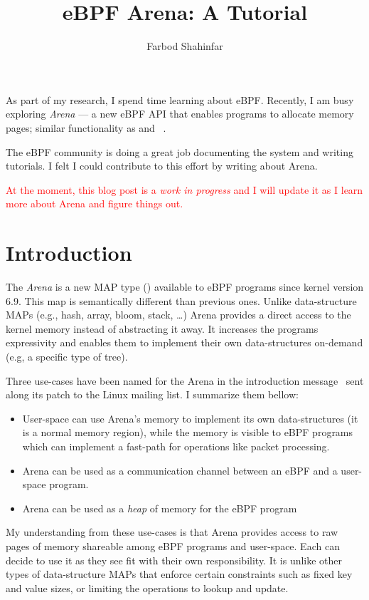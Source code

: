 \documentclass{article}
\title{eBPF Arena: A Tutorial}
\author{Farbod Shahinfar}
\begin{document}
\maketitle



As part of my research, I spend time learning about eBPF.
Recently, I am busy exploring \emph{Arena} --- a new eBPF API that enables
programs to allocate memory pages; similar functionality as  and
~\cite{arenapatch}.

The eBPF community is doing a great job documenting the system and writing
tutorials. I felt I could contribute to this effort by writing about Arena.

{
    \textcolor{red}{At the moment, this blog post is a \emph{work in
    progress} and I will update it as I learn more about Arena and figure
    things out.}
}

\section{Introduction}

The \emph{Arena} is a new MAP type () available to eBPF programs
since kernel version 6.9.
This map is semantically different than previous ones.
Unlike data-structure MAPs (e.g., hash, array, bloom, stack, \dots{}) Arena
provides a direct access to the kernel memory instead of abstracting it away.
It increases the programs expressivity and enables them to implement their own
data-structures on-demand (e.g, a specific type of tree).

Three use-cases have been named for the Arena in the introduction
message~\cite{arenapatch} sent along its patch to the Linux mailing list. I
summarize them bellow:
\begin{itemize}
    \item User-space can use Arena's memory to implement its own
        data-structures (it is a normal memory region), while the memory is
        visible to eBPF programs which can implement a fast-path for operations
        like packet processing.
    \item Arena can be used as a communication channel between an eBPF and a
        user-space program.
    \item Arena can be used as a \emph{heap} of memory for the eBPF program
\end{itemize}
My understanding from these use-cases is that Arena provides access to raw
pages of memory shareable among eBPF programs and user-space. Each can decide
to use it as they see fit with their own responsibility. It is unlike other
types of data-structure MAPs that enforce certain constraints such as fixed key
and value sizes, or limiting the operations to lookup and update.
\end{document}
